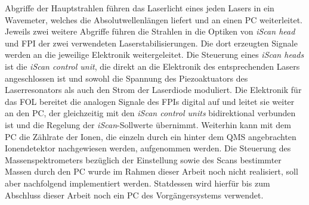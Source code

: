 Abgriffe der Hauptstrahlen führen das Laserlicht eines jeden Lasers in ein
Wavemeter, welches die Absolutwellenlängen liefert und an einen PC weiterleitet.
Jeweils zwei weitere Abgriffe führen die Strahlen in die Optiken von
\textit{iScan head} und FPI der zwei verwendeten Laserstabilisierungen. Die dort erzeugten
Signale werden an die jeweilige Elektronik weitergeleitet. Die Steuerung eines
\textit{iScan heads} ist die \textit{iScan control unit}, die direkt an die
Elektronik des entsprechenden Lasers angeschlossen ist und sowohl die Spannung
des Piezoaktuators des Laserresonators als auch den Strom der Laserdiode
moduliert.
Die Elektronik für das FOL bereitet die analogen Signale des FPIs digital auf und
leitet sie weiter an den PC, der gleichzeitig mit den \textit{iScan control units} bidirektional
verbunden ist und die Regelung der \textit{iScan}-Sollwerte übernimmt. Weiterhin
kann mit dem PC die Zählrate der Ionen, die einzeln durch ein hinter dem QMS
angebrachten Ionendetektor nachgewiesen werden, aufgenommen werden. Die
Steuerung des Massenspektrometers bezüglich der Einstellung sowie des Scans
bestimmter Massen durch den PC wurde im Rahmen dieser Arbeit noch nicht realisiert, soll aber
nachfolgend implementiert werden. Statdessen wird hierfür bis zum Abschluss
dieser Arbeit noch ein PC des Vorgängersystems verwendet.

